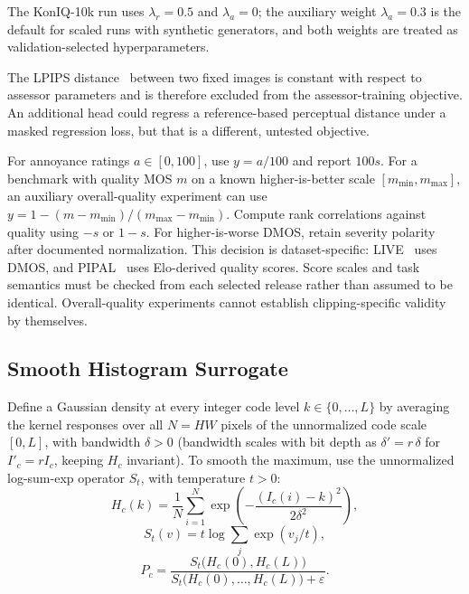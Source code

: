 \documentclass[5p,times,twocolumn]{elsarticle}
\begin{document}
The KonIQ-10k run uses $\lambda_r = 0.5$ and $\lambda_a = 0$; the auxiliary
weight $\lambda_a = 0.3$ is the default for scaled runs with synthetic
generators, and both weights are treated as validation-selected
hyperparameters.

The LPIPS distance~\cite{zhang2018lpips} between two fixed images is constant
with respect to assessor parameters and is therefore excluded from the
assessor-training objective. An additional head could regress a
reference-based perceptual distance under a masked regression loss, but that
is a different, untested objective.

For annoyance ratings $a \in [0, 100]$, use $y = a/100$ and report $100s$. For
a benchmark with quality MOS $m$ on a known higher-is-better scale
$[m_{\min}, m_{\max}]$, an auxiliary overall-quality experiment can use
$y = 1 - (m - m_{\min})/(m_{\max} - m_{\min})$. Compute rank correlations
against quality using $-s$ or $1-s$. For higher-is-worse DMOS, retain severity
polarity after documented normalization. This decision is dataset-specific:
LIVE~\cite{sheikh2006live} uses DMOS, and PIPAL~\cite{gu2020pipal} uses
Elo-derived quality scores. Score scales and task semantics must be checked
from each selected release rather than assumed to be identical.
Overall-quality experiments cannot establish clipping-specific validity by
themselves.

\subsection{Smooth Histogram Surrogate}
\label{sec:surrogate}

Define a Gaussian density at every integer code level $k \in \{0, \ldots, L\}$
by averaging the kernel responses over all $N = HW$ pixels of the
unnormalized code scale $[0, L]$, with bandwidth $\delta > 0$ (bandwidth
scales with bit depth as $\delta' = r\,\delta$ for $I'_c = r I_c$, keeping
$H_c$ invariant). To smooth the maximum, use the unnormalized log-sum-exp
operator $S_t$, with temperature $t > 0$:
\begin{equation}
H_c(k) = \frac{1}{N} \sum_{i=1}^{N}
\exp\!\left(-\frac{(I_c(i) - k)^2}{2\delta^2}\right),
\label{eq:smoothhist}
\end{equation}
\begin{equation}
S_t(v) = t \log \sum_j \exp(v_j / t),
\label{eq:lse}
\end{equation}
\begin{equation}
P_c = \frac{S_t\big(H_c(0), H_c(L)\big)}
{S_t\big(H_c(0), \ldots, H_c(L)\big) + \varepsilon}.
\label{eq:ratio}
\end{equation}
\end{document}
